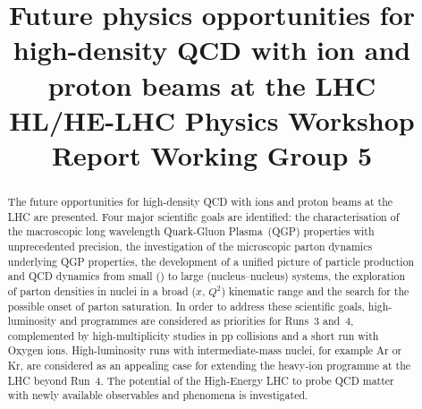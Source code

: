 \documentclass[11pt,twoside,a4paper]{cernrep}
\def\bibfiles{\main/bib/chapter,\main/introduction/bib/section,\main/schedule/bib/section,\main/hf/bib/section,\main/quarkonia/bib/section,\main/thermalradiation/bib/section,\main/flow/bib/section,\main/smallsystems/bib/section,\main/lightflavour/bib/section,\main/jets/bib/section,\main/smallx/bib/section,\main/beyond/bib/section,\main/helhc/bib/section,\main/accelerator/bib/section,\main/smallAexec/bib/section}
\providecommand{\biblio}{\nocite{article-minimal}\clearpage}  %
\begin{document}
\newcommand{\main}{.}



\title{Future physics opportunities for high-density QCD with ion and proton beams at the LHC \\
HL/HE-LHC Physics Workshop Report Working Group 5}


\maketitle

\begin{abstract}
 The future opportunities for high-density QCD with ions and proton beams at the LHC are presented. Four major scientific goals are identified: the characterisation of the macroscopic long wavelength Quark-Gluon Plasma~(QGP) properties with unprecedented precision, the investigation of the microscopic parton dynamics underlying QGP properties, the development of a unified picture of particle production and QCD dynamics from small (\pp) to large (nucleus--nucleus) systems, the exploration of parton densities in nuclei in a broad ($x$, $Q^2$) kinematic range and the search for the possible onset of parton saturation. In order to address these scientific goals, high-luminosity \PbPb and \pPb programmes are considered as priorities for Runs~3 and~4, complemented by high-multiplicity studies in pp collisions and a  short run with Oxygen ions. High-luminosity runs with intermediate-mass nuclei, for example Ar or Kr, are considered as an appealing case for extending the heavy-ion programme at the LHC beyond Run~4. The potential of the High-Energy LHC to probe QCD matter with newly available observables and phenomena is investigated.
\end{abstract}

\setcounter{tocdepth}{2}
{ 
\baselineskip=12pt
\tableofcontents
}
\clearpage


\clearpage

\clearpage

\clearpage

\clearpage

\clearpage

\clearpage

\clearpage

\clearpage

\clearpage

\clearpage

\clearpage

\clearpage

\clearpage



%
%
\footnotesize
\biblio
\end{document}
